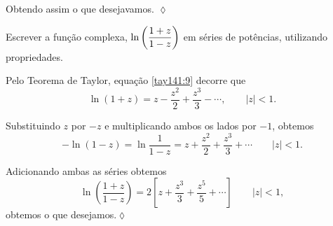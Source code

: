 Obtendo assim o que desejavamos. \hfill \(\lozenge\)

\begin{exer}[Logaritmo]
Escrever  a fun\c{c}\~{a}o complexa,  $\displaystyle{\ln\left(\frac{1 +
z}{1-z}\right)}$ em s\'{e}ries de pot\^{e}ncias, utilizando propriedades.
\end{exer}

\solo Pelo Teorema de Taylor, equa\c{c}\~{a}o \eqref{tay141:9} decorre que
\begin{equation}\label{elem142:7}
\ln(1 + z) = z - \frac{z^2}{2} + \frac{z^3 }{3}- \cdots,\qquad
|z|<1.
\end{equation}

Substituindo $z$ por $-z$ e multiplicando ambos os lados por $-
1$, obtemos
\begin{equation}\label{elem142:8}
-\ln(1-z) = \ln \frac{1}{1-z} = z + \frac{z^2}{2} + \frac{z^3}{3}
+\cdots \qquad | z |<1.
\end{equation}

Adicionando ambas as s\'{e}ries obtemos
\begin{equation}\label{elem142:9}
\ln \left(\frac{1 + z}{1-z}\right) = 2
\left[z+\frac{z^3}{3}+\frac{z^5}{5}+\cdots \right]\qquad |z|<1,
\end{equation}
obtemos o que desejamos.\hfill \(\lozenge\)

